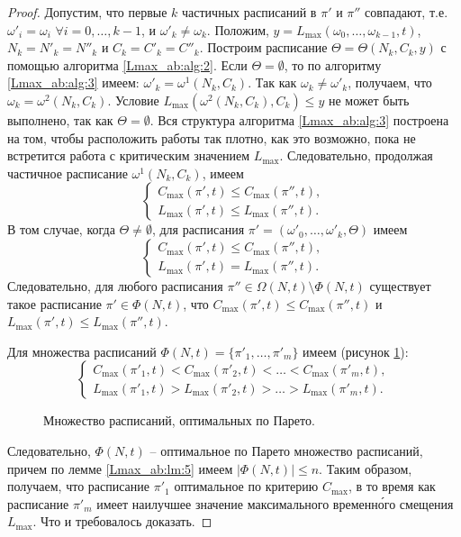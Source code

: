 \begin{proof}
Допустим, что первые $k$ частичных расписаний в $\pi'$ и $\pi''$ совпадают, т.е. $\omega'_i = \omega_i$  $\forall i = 0, \dots, k-1$, и $\omega'_k \neq \omega_k$. Положим, $y = L_{\max}(\omega_0, \dots , \omega_{k-1},t)$, $N_k = N'_k = N''_k$ и $C_k = C'_k = C''_k$. Построим расписание $\Theta = \Theta(N_k,C_k,y)$  с помощью алгоритма \ref{Lmax_ab:alg:2}. Если $\Theta = \emptyset$, то по алгоритму \ref{Lmax_ab:alg:3} имеем: $\omega'_k = \omega^1(N_k,C_k)$. Так как $\omega_k \neq \omega'_k$, получаем, что $\omega_k = \omega^2(N_k,C_k)$. Условие $L_{\max}(\omega^2(N_k,C_k), C_k) \leq y$ не может быть выполнено, так как $\Theta = \emptyset$. Вся структура алгоритма \ref{Lmax_ab:alg:3} построена на том, чтобы расположить работы так плотно, как это возможно, пока не встретится работа с критическим значением $L_{\max}$. Следовательно, продолжая частичное расписание $\omega^1(N_k,C_k)$, имеем
\begin{equation*}
    \begin{cases}
        C_{\max}(\pi',t) \leq C_{\max}(\pi'',t),\\
        L_{\max}(\pi',t) \leq L_{\max}(\pi'',t).
    \end{cases}
\end{equation*}
В том случае, когда $\Theta \neq \emptyset$, для расписания $\pi' = (\omega'_0, \dots, \omega'_k, \Theta)$ имеем
\begin{equation*}
    \begin{cases}
        C_{\max}(\pi',t) \leq C_{\max}(\pi'',t),\\
        L_{\max}(\pi',t) = L_{\max}(\pi'',t).
    \end{cases}
\end{equation*}
Следовательно, для любого расписания $\pi'' \in \Omega(N,t) \setminus \Phi(N,t)$ существует такое расписание $\pi' \in \Phi(N,t)$, что $C_{\max}(\pi',t) \leq C_{\max}(\pi'',t)$ и $L_{\max}(\pi',t) \leq L_{\max}(\pi'',t)$.

Для множества расписаний $\Phi(N,t) = \{\pi'_1, \dots, \pi'_m\}$ имеем (рисунок \ref{Lmax_ab:ris:4}):
\begin{equation}
    \begin{cases}
        C_{\max}(\pi'_1,t) < C_{\max}(\pi'_2,t) < \dots < C_{\max}(\pi'_m,t),\\
        L_{\max}(\pi'_1,t) > L_{\max}(\pi'_2,t) > \dots > L_{\max}(\pi'_m,t).
    \end{cases}
\end{equation}

\begin{figure}[h!]
\caption{Множество расписаний, оптимальных по Парето.}
\label{Lmax_ab:ris:4}
\end{figure}

Следовательно, $\Phi(N,t)$ -- оптимальное по Парето множество расписаний, причем по лемме \ref{Lmax_ab:lm:5} имеем $|\Phi(N,t)| \leq n$.
Таким образом, получаем, что расписание $\pi'_1$ оптимальное по критерию $C_{\max}$, в то время как расписание $\pi'_m$ имеет наилучшее значение максимального временн\'{о}го смещения $L_{\max}$. Что и требовалось доказать.
\end{proof}

